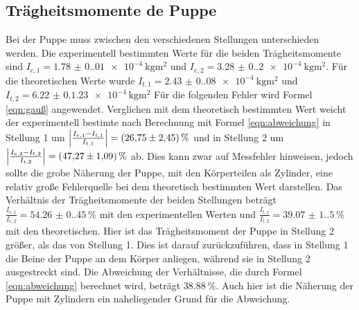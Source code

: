     \subsection{Trägheitsmomente de Puppe}
    Bei der Puppe muss zwischen den verschiedenen Stellungen unterschieden werden.
    Die experimentell bestimmten Werte für die beiden Trägheitsmomente sind $I_{e,1}=\qty{1.78(0.01)e-4}{\kilo\gram\meter\squared}$ und $I_{e,2}=\qty{3.28(0.2)e-4}{\kilo\gram\meter\squared}$.
    Für die theoretischen Werte wurde $I_{t,1}=\qty{2.43(0.08)e-4}{\kilo\gram\meter\squared}$ und $I_{t,2}=\qty{6.22(0.123)e-4}{\kilo\gram\meter\squared}$
    Für die folgenden Fehler wird Formel \ref{eqn:gauß} angewendet.
    Verglichen mit dem theoretisch bestimmten Wert weicht der experimentell bestimte nach Berechnung mit Formel \ref{eqn:abweichung} in Stellung 1 um $\Bigl|\frac{I_{e,1}-I_{t,1}}{I_{t,1}}\Bigr|=\qty{26.75(2.45)}{\percent}$ und in Stellung 2 um $\Bigl|\frac{I_{e,2}-I_{t,2}}{I_{t,2}}\Bigr|=\qty{47.27(1.09)}{\percent}$ ab.
    Dies kann zwar auf Messfehler hinweisen, jedoch sollte die grobe Näherung der Puppe, mit den Körperteilen als Zylinder, eine relativ große Fehlerquelle bei dem theoretisch bestimmten Wert darstellen.
    Das Verhältnis der Trägheitsmomente der beiden Stellungen beträgt $\frac{I_{e,1}}{I_{e,2}}=\qty{54.26(0.45)}{\percent}$ mit den experimentellen Werten und $\frac{I_{t,1}}{I_{t,2}}=\qty{39.07(1.5)}{\percent}$ mit den theoretischen.
    Hier ist das Trägheitsmoment der Puppe in Stellung 2 größer, als das von Stellung 1. 
    Dies ist darauf zurückzuführen, dass in Stellung 1 die Beine der Puppe an dem Körper anliegen, während sie in Stellung 2 ausgestreckt sind.
    Die Abweichung der Verhältnisse, die durch Formel \ref{eqn:abweichung} berechnet wird, beträgt $\qty{38.88}{\percent}$.
    Auch hier ist die Näherung der Puppe mit Zylindern ein naheliegender Grund für die Abweichung.